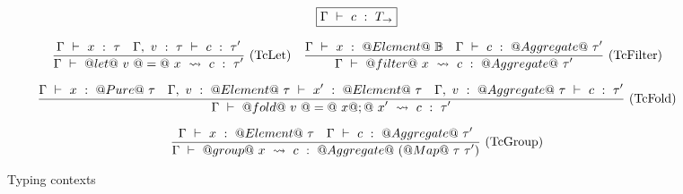\begin{figure*}

$$
\boxed{\Gamma ~\vdash~ c ~:~ T_\to}
$$


$$
\frac {\displaystyle 
    \Gamma ~\vdash~ x ~:~ \tau
    \quad
    \Gamma,~v~:~\tau ~\vdash~ c ~:~ \tau'
} {\displaystyle 
    \Gamma ~\vdash~ @let@~v~@=@~x~\leadsto~c ~:~ \tau'
} \ 
\textrm{(TcLet)}
\quad
\frac {\displaystyle 
    \Gamma ~\vdash~ x ~:~ @Element@~\mathbb{B}
    \quad
    \Gamma ~\vdash~ c ~:~ @Aggregate@~\tau'
} {\displaystyle 
    \Gamma ~\vdash~ @filter@~x~\leadsto~c ~:~ @Aggregate@~\tau'
} \ 
\textrm{(TcFilter)}
$$

$$
\frac {\displaystyle 
    \Gamma ~\vdash~ x ~:~ @Pure@~\tau
    \quad
    \Gamma,~v~:~@Element@~\tau ~\vdash~ x' ~:~ @Element@~\tau
    \quad
    \Gamma,~v~:~@Aggregate@~\tau ~\vdash~ c ~:~ \tau'
} {\displaystyle 
    \Gamma ~\vdash~ @fold@~v~@=@~x@;@~x'~\leadsto~c ~:~ \tau'
} \ 
\textrm{(TcFold)}
$$

$$
\frac {\displaystyle 
    \Gamma ~\vdash~ x ~:~ @Element@~\tau
    \quad
    \Gamma ~\vdash~ c ~:~ @Aggregate@~\tau'
} {\displaystyle 
    \Gamma ~\vdash~ @group@~x~\leadsto~c ~:~ @Aggregate@~(@Map@~\tau~\tau')
} \ 
\textrm{(TcGroup)}
$$



\caption{Typing contexts}
\label{fig:source:type:ctx}
\end{figure*}

